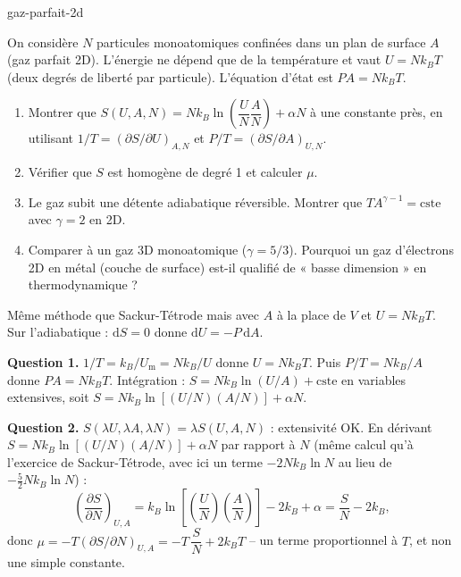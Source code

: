 \begin{exo}{gaz-parfait-2d}

On considère $N$ particules monoatomiques confinées dans un plan de surface $A$ (gaz parfait 2D). L'énergie ne dépend que de la température et vaut $U = N k_B T$ (deux degrés de liberté par particule). L'équation d'état est $PA = N k_B T$.

\begin{enumerate}
\item Montrer que $S(U,A,N) = Nk_B\ln\!\left(\dfrac{U}{N}\dfrac{A}{N}\right) + \alpha N$ à une constante près, en utilisant $1/T = \left(\partial S/\partial U\right)_{A,N}$ et $P/T = \left(\partial S/\partial A\right)_{U,N}$.
\item Vérifier que $S$ est homogène de degré 1 et calculer $\mu$.
\item Le gaz subit une détente adiabatique réversible. Montrer que $TA^{\gamma-1} = \text{cste}$ avec $\gamma = 2$ en 2D.
\item Comparer à un gaz 3D monoatomique ($\gamma = 5/3$). Pourquoi un gaz d'électrons 2D en métal (couche de surface) est-il qualifié de « basse dimension » en thermodynamique ?
\end{enumerate}

\begin{indication}
Même méthode que Sackur-Tétrode mais avec $A$ à la place de $V$ et $U = Nk_BT$. Sur l'adiabatique : $\mathrm{d}S = 0$ donne $\mathrm{d}U = -P\,\mathrm{d}A$.
\end{indication}

\begin{solution}
\textbf{Question 1.} $1/T = k_B/U_{\text{m}} = Nk_B/U$ donne $U = Nk_BT$. Puis $P/T = Nk_B/A$ donne $PA = Nk_BT$. Intégration : $S = Nk_B\ln(U/A) + \text{cste}$ en variables extensives, soit $S = Nk_B\ln[(U/N)(A/N)] + \alpha N$.

\textbf{Question 2.} $S(\lambda U, \lambda A, \lambda N) = \lambda S(U,A,N)$ : extensivité OK. En dérivant $S = Nk_B\ln[(U/N)(A/N)] + \alpha N$ par rapport à $N$ (même calcul qu'à l'exercice de Sackur-Tétrode, avec ici un terme $-2Nk_B\ln N$ au lieu de $-\tfrac{5}{2}Nk_B\ln N$) :
\[
\left(\frac{\partial S}{\partial N}\right)_{U,A} = k_B\ln\!\left[\left(\frac{U}{N}\right)\!\left(\frac{A}{N}\right)\right] - 2k_B + \alpha = \frac{S}{N} - 2k_B,
\]
donc $\mu = -T\left(\partial S/\partial N\right)_{U,A} = -T\,\dfrac{S}{N} + 2k_BT$ -- un terme proportionnel à $T$, et non une simple constante.


\end{solution}
\end{exo}

